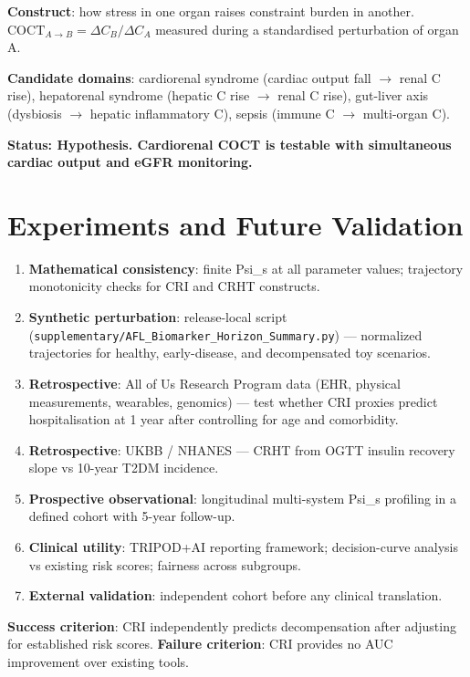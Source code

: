 \documentclass[12pt,a4paper]{article}
\begin{document}
\textbf{Construct}: how stress in one organ raises constraint burden in another. $\mathrm{COCT}_{A \to B} = \Delta C_B / \Delta C_A$ measured during a standardised perturbation of organ A.

\textbf{Candidate domains}: cardiorenal syndrome (cardiac output fall $\to$ renal C rise), hepatorenal syndrome (hepatic C rise $\to$ renal C rise), gut-liver axis (dysbiosis $\to$ hepatic inflammatory C), sepsis (immune C $\to$ multi-organ C).

\textbf{Status: Hypothesis. Cardiorenal COCT is testable with simultaneous cardiac output and eGFR monitoring.}

\section{Experiments and Future Validation}

\begin{enumerate}
    \item \textbf{Mathematical consistency}: finite Psi\_s at all parameter values; trajectory monotonicity checks for CRI and CRHT constructs.
    \item \textbf{Synthetic perturbation}: release-local script (\texttt{supplementary/AFL\_Biomarker\_Horizon\_Summary.py}) — normalized trajectories for healthy, early-disease, and decompensated toy scenarios.
    \item \textbf{Retrospective}: All of Us Research Program data (EHR, physical measurements, wearables, genomics) — test whether CRI proxies predict hospitalisation at 1 year after controlling for age and comorbidity.
    \item \textbf{Retrospective}: UKBB / NHANES — CRHT from OGTT insulin recovery slope vs 10-year T2DM incidence.
    \item \textbf{Prospective observational}: longitudinal multi-system Psi\_s profiling in a defined cohort with 5-year follow-up.
    \item \textbf{Clinical utility}: TRIPOD+AI reporting framework; decision-curve analysis vs existing risk scores; fairness across subgroups.
    \item \textbf{External validation}: independent cohort before any clinical translation.
\end{enumerate}

\textbf{Success criterion}: CRI independently predicts decompensation after adjusting for established risk scores. \textbf{Failure criterion}: CRI provides no AUC improvement over existing tools.
\end{document}
